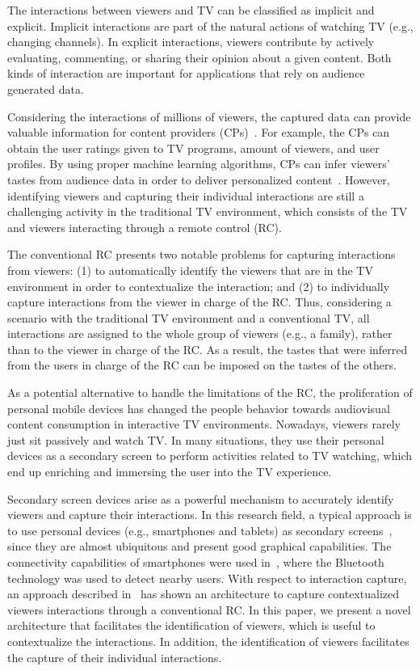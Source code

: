 \documentclass[conference,a4paper]{IEEEtran}
\begin{document}
The interactions between viewers and TV can be classified as implicit and explicit. Implicit interactions are part of the natural actions of watching TV (e.g., changing channels). In explicit interactions, viewers contribute by actively evaluating, commenting, or sharing their opinion about a given content. Both kinds of interaction are important for applications that rely on audience generated data.

Considering the interactions of millions of viewers, the captured data can provide valuable information for content providers (CPs)~\cite{Teixeira2010}. For example, the CPs can obtain the user ratings given to TV programs, amount of viewers, and user profiles. By using proper machine learning algorithms, CPs can infer viewers' tastes from audience data in order to deliver personalized content~\cite{Kim2012,Shin2009}. However, identifying viewers and capturing their individual interactions are still a challenging activity in the traditional TV environment, which consists of the TV and viewers interacting through a remote control (RC).

The conventional RC presents two notable problems for capturing interactions from viewers: (1) to automatically identify the viewers that are in the TV environment in order to contextualize the interaction; and (2) to individually capture interactions from the viewer in charge of the RC. Thus, considering a scenario with the traditional TV environment and a conventional TV, all interactions are assigned to the whole group of viewers (e.g., a family), rather than to the viewer in charge of the RC. As a result, the tastes that were inferred from the users in charge of the RC can be imposed on the tastes of the others.

As a potential alternative to handle the limitations of the RC, the proliferation of personal mobile devices has changed the people behavior towards audiovisual content consumption in interactive TV environments. Nowadays, viewers rarely just sit passively and watch TV. In many situations, they use their personal devices as a secondary screen to perform activities related to TV watching, which end up enriching and immersing the user into the TV experience. 

Secondary screen devices arise as a powerful mechanism to accurately identify viewers and  capture their interactions. In this research field, a typical approach is to use personal devices (e.g., smartphones and tablets) as secondary screens~\cite{Courtois2012}, since they are almost ubiquitous and present good graphical capabilities. The connectivity capabilities of smartphones were used in~\cite{Cabarcos2011}, where the Bluetooth technology was used to detect nearby users. With respect to interaction capture, an approach described in~\cite{Teixeira2010} has shown an architecture to capture contextualized viewers interactions through a conventional RC. In this paper, we present a novel architecture that facilitates the identification of viewers, which is useful to contextualize the interactions. In addition, the identification of viewers facilitates the capture of their individual interactions.
\end{document}
